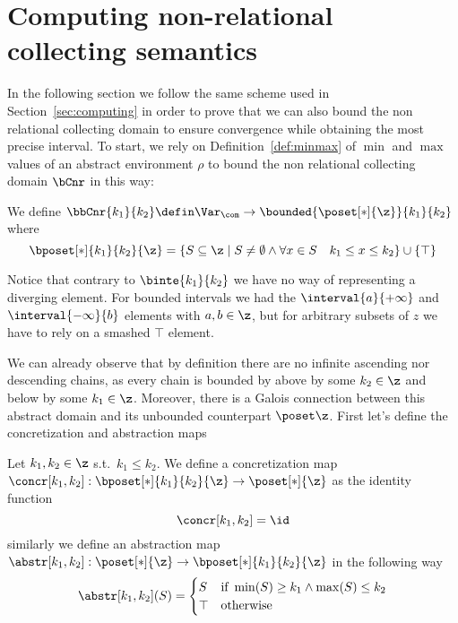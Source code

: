 \section{Computing non-relational collecting semantics}\label{sec:computingnonrel}

In the following section we follow the same scheme used in
Section~\ref{sec:computing} in order to prove that we can also bound
the non relational collecting domain to ensure convergence while
obtaining the most precise interval.  To start, we rely on
Definition~\ref{def:minmax} of \(\min\) and \(\max\) values of an
abstract environment \(\rho\) to bound the non relational collecting
domain \(\bCnr\) in this way:

\begin{definition}
  We define
  \(\bbCnr{k_1}{k_2} \defin \Var_{\com} \to \bounded{\poset[*]{\z}}{k_1}{k_2}\) where
  \begin{equation*}
    \bposet[*]{k_1}{k_2}{\z} = \{S \subseteq \z \mid S \neq \emptyset \land \forall x \in S \quad k_1 \leq x \leq k_2\} \cup \{\top\}
  \end{equation*}
\end{definition}
Notice that contrary to \(\binte{k_1}{k_2}\) we have no way of
representing a diverging element. For bounded intervals we had the
\(\interval{a}{+\infty}\) and \(\interval{-\infty}{b}\) elements with
\(a,b\in\z\), but for arbitrary subsets of \(z\) we have to rely on a
smashed \(\top\) element.

\medskip

\noindent
We can already observe that by definition there are no infinite
ascending nor descending chains, as every chain is bounded by above
by some \(k_2 \in \z\) and below by some \(k_1\in\z\). Moreover, there
is a Galois connection between this abstract domain and its unbounded
counterpart \(\poset\z\). First let's define the concretization and
abstraction maps

\begin{definition}\label{def:abstrnrb}
  Let \(k_1,k_2\in\z\) s.t.\ \(k_1 \leq k_2\). We define a
  concretization map
  \(\concr[k_1,k_2] : \bposet[*]{k_1}{k_2}{\z} \to \poset[*]{\z}\) as
  the identity function
  \begin{equation*}
    \concr[k_1,k_2] = \id
  \end{equation*}
  similarly we define an abstraction map
  \(\abstr[k_1,k_2] : \poset[*]{\z} \to \bposet[*]{k_1}{k_2}{\z}\) in
  the following way
  \begin{equation*}
    \abstr[k_1,k_2](S) = \begin{cases}
      S & \text{if } \min(S) \geq k_1 \land \max(S) \leq k_2 \\
      \top & \text{otherwise}
    \end{cases}
  \end{equation*}
\end{definition}

